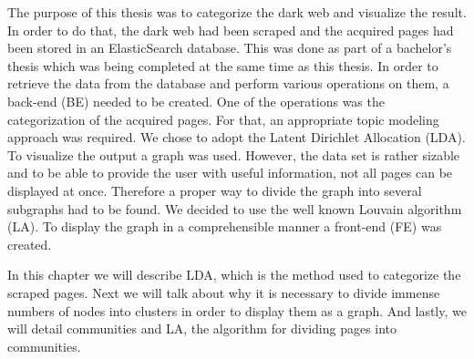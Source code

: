 The purpose of this thesis was to categorize the dark web and visualize the result. In order to do that, the dark web had been scraped and the acquired pages had been stored in an ElasticSearch database. This was done as part of a bachelor's thesis which was being completed at the same time as this thesis. In order to retrieve the data from the database and perform various operations on them, a back-end (BE) needed to be created. One of the operations was the categorization of the acquired pages. For that, an appropriate topic modeling approach was required. We chose to adopt the Latent Dirichlet Allocation (LDA). To visualize the output a graph was used. However, the data set is rather sizable and to be able to provide the user with useful information, not all pages can be displayed at once. Therefore a proper way to divide the graph into several subgraphs had to be found. We decided to use the well known Louvain algorithm (LA). To display the graph in a comprehensible manner a front-end (FE) was created.

In this chapter we will describe LDA,  which is the method used to categorize the scraped pages. Next we will talk about why it is necessary to divide immense numbers of nodes into clusters in order to display them as a graph. And lastly, we will detail communities and LA, the algorithm for dividing pages into communities. 

